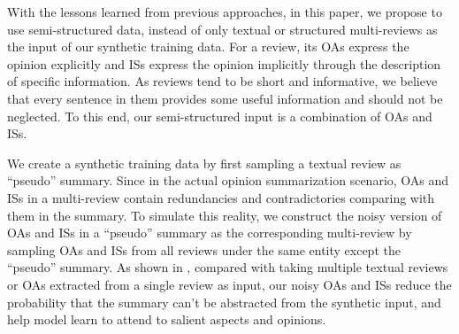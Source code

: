 With the lessons learned from previous approaches,
in this paper, we propose to use semi-structured data, 
instead of only textual or structured multi-reviews as the input of our synthetic
training data. 
For a review, its OAs express the opinion explicitly
and ISs express the opinion implicitly through the description of specific information.
As reviews tend to be short and informative,
we believe that every sentence in them provides some useful information and should not be neglected.
To this end, our semi-structured input is a combination of OAs and ISs.

We create a synthetic training data by 
first sampling a textual review as ``pseudo'' summary.
Since in the actual opinion summarization scenario,
OAs and ISs in a multi-review contain redundancies and contradictories comparing with them in the summary.
To simulate this reality, we construct the noisy version of OAs and ISs in a ``pseudo'' summary as the corresponding multi-review 
by sampling OAs and ISs from all reviews under the same entity except the ``pseudo'' summary.
As shown in , 
compared with taking multiple textual 
reviews or OAs extracted from a single review as input,
our noisy OAs and ISs %
reduce the probability that the summary can't be abstracted from the synthetic input,
and help model learn to attend to salient aspects and opinions.

